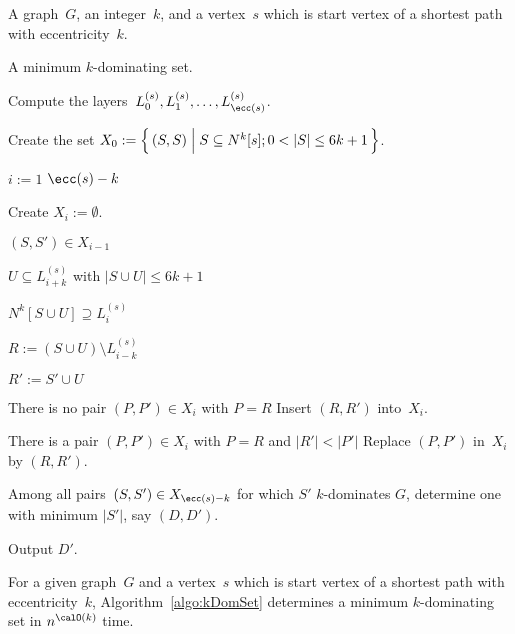 \begin{algorithm}
    [htb]
    \caption
    {%
        Determines a minimum $k$-dominating set in a given graph~$G$ containing a shortest path of eccentricity~$k$ starting at~$s$.
    }
    \label{algo:kDomSet}
%

\KwIn
{%
    A graph~$G$, an integer~$k$, and a vertex~$s$ which is start vertex of a shortest path with eccentricity~$k$.
}

\KwOut
{%
    A minimum $k$-dominating set.
}

Compute the layers~$L_0^{(s)}, L_1^{(s)}, \ldots, L_{\ecc(s)}^{(s)}$.

Create the set $X_0 := \Big \{ \, (S, S) \Bigm | S \subseteq N^k[s]; 0 < |S| \leq 6k + 1 \, \Big \}$.
\label{line:CreateX0}

\For
{%
    $i := 1$ \KwTo $\ecc(s) - k$%
    \label{line:layerLoop}%
}
{%
    Create $X_i := \emptyset$.

    \ForEach
    {%
        $(S, S') \in X_{i-1}$
    }
    {%
        \ForEach
        {%
            $U \subseteq L_{i+k}^{(s)}$ with $|S \cup U| \leq 6k + 1$%
            \label{line:Uloop}
        }
        {%
            \If
            {%
                $N^k[S \cup U] \supseteq L_{i}^{(s)}$%
                \label{line:kDomCheck}
            }
            {%
                $R := (S \cup U) \setminus L_{i-k}^{(s)}$

                $R' := S' \cup U$
                \label{line:setRprime}

                \If
                {%
                    There is no pair $(P, P') \in X_i$ with $P = R$
                    \label{line:checkEqualPair}
                }
                {%
                    Insert $(R, R')$ into~$X_i$.
                }

                \If
                {%
                    There is a pair $(P, P') \in X_i$ with $P = R$ and $|R'| < |P'|$
                }
                {%
                    Replace $(P, P')$ in~$X_i$ by $(R, R')$.
                    \label{line:replacePair}
                }
            }
        }
    }
}

Among all pairs~$(S, S') \in X_{\ecc(s) - k}$ for which $S'$ $k$-dominates $G$, determine one with minimum $|S'|$, say $(D, D')$.

Output $D'$.
\end{algorithm}

\begin{theorem}
    \label{theo:kDomFromkESP}
For a given graph~\( G \) and a vertex~\( s \) which is start vertex of a shortest path with eccentricity~\( k \), Algorithm~\ref{algo:kDomSet} determines a minimum \( k \)-dominating set in \( n^{\calO(k)} \) time.
\end{theorem}

